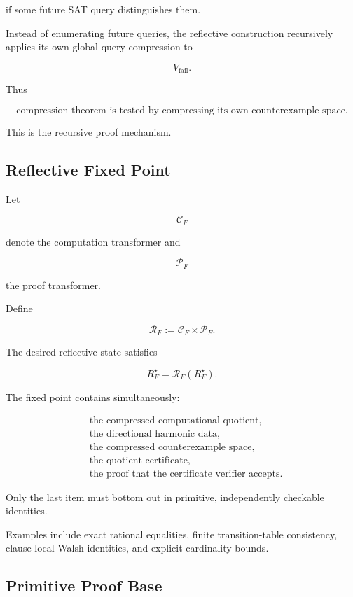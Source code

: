 \documentclass[11pt]{article}
\theoremstyle{plain}
\theoremstyle{definition}
\begin{document}
if some future SAT query distinguishes them.

Instead of enumerating future queries, the reflective construction recursively
applies its own global query compression to

\[
    V_{\mathrm{fail}}.
\]

Thus

\[
\boxed{
\text{compression theorem}
\text{ is tested by compressing its own counterexample space}.
}
\]

This is the recursive proof mechanism.

\subsection{Reflective Fixed Point}

Let

\[
    \mathcal{C}_F
\]

denote the computation transformer and

\[
    \mathcal{P}_F
\]

the proof transformer.

Define

\[
    \mathcal{R}_F
    :=
    \mathcal{C}_F
    \times
    \mathcal{P}_F.
\]

The desired reflective state satisfies

\[
\boxed{
R_F^\star
=
\mathcal{R}_F(R_F^\star).
}
\]

The fixed point contains simultaneously:

\[
\begin{aligned}
&\text{the compressed computational quotient},\\
&\text{the directional harmonic data},\\
&\text{the compressed counterexample space},\\
&\text{the quotient certificate},\\
&\text{the proof that the certificate verifier accepts}.
\end{aligned}
\]

Only the last item must bottom out in primitive, independently checkable
identities.

Examples include exact rational equalities, finite transition-table
consistency, clause-local Walsh identities, and explicit cardinality bounds.

\subsection{Primitive Proof Base}
\end{document}
